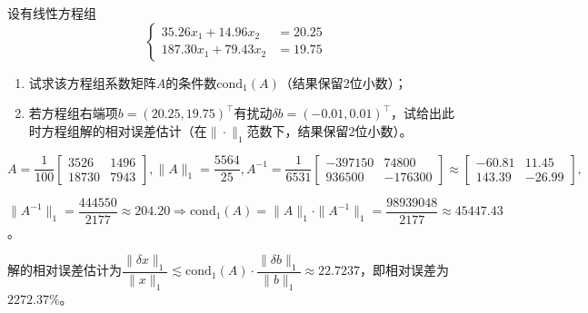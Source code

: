     \begin{homework}[6+4pts]
        设有线性方程组
            \[\begin{cases}35.26x_1+14.96x_2&=20.25\\187.30x_1+79.43x_2&=19.75\end{cases}\]
        \begin{enumerate}
            \item 试求该方程组系数矩阵$A$的条件数$\mathrm{cond}_1(A)$（结果保留2位小数）；
            \item 若方程组右端项$b=(20.25,19.75)^{\top}$有扰动$\delta b=(-0.01,0.01)^{\top}$，试给出此时方程组解的相对误差估计（在$\|\cdot\|_1$范数下，结果保留$2$位小数）。
        \end{enumerate}
    \end{homework}

    \begin{solution}
        $A=\dfrac1{100}\begin{bmatrix}3526&1496\\18730&7943\end{bmatrix},\|A\|_1=\dfrac{5564}{25},A^{-1}=\dfrac1{6531}\begin{bmatrix}-397150&74800\\936500&-176300\end{bmatrix}\approx\begin{bmatrix}-60.81&11.45\\143.39&-26.99\end{bmatrix},$

        $\|A^{-1}\|_1=\dfrac{444550}{2177}\approx204.20\Rightarrow \mathrm{cond}_1(A)=\|A\|_1\cdot\|A^{-1}\|_1=\dfrac{98939048}{2177}\approx 45447.43$。

        解的相对误差估计为$\dfrac{\|\delta x\|_1}{\|x\|_1}\lesssim\mathrm{cond}_1(A)\cdot\dfrac{\|\delta b\|_1}{\|b\|_1}\approx 22.7237$，即相对误差为$2272.37\%$。
    \end{solution}

